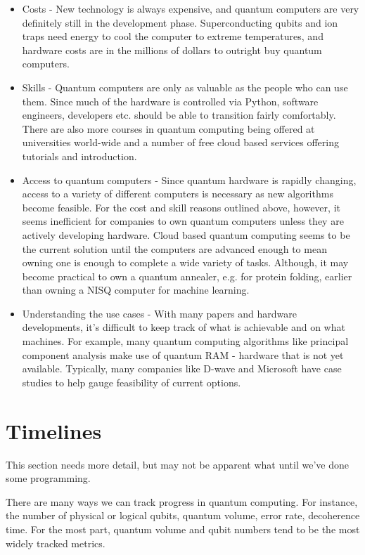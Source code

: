 \documentclass{article}
\theoremstyle{definition}
\begin{document}
\begin{itemize}
    \item Costs - New technology is always expensive, and quantum computers are very definitely still in the development phase. Superconducting qubits and ion traps need energy to cool the computer to extreme temperatures, and hardware costs are in the millions of dollars to outright buy quantum computers. 
    \item Skills - Quantum computers are only as valuable as the people who can use them. Since much of the hardware is controlled via Python, software engineers, developers etc. should be able to transition fairly comfortably. There are also more courses in quantum computing being offered at universities world-wide and a number of free cloud based services offering tutorials and introduction. 
    \item Access to quantum computers - Since quantum hardware is rapidly changing, access to a variety of different computers is necessary as new algorithms become feasible. For the cost and skill reasons outlined above, however, it seems inefficient for companies to own quantum computers unless they are actively developing hardware. Cloud based quantum computing seems to be the current solution until the computers are advanced enough to mean owning one is enough to complete a wide variety of tasks. Although, it may become practical to own a quantum annealer, e.g. for protein folding, earlier than owning a NISQ computer for machine learning. 
    \item Understanding the use cases - With many papers and hardware developments, it's difficult to keep track of what is achievable and on what machines. For example, many quantum computing algorithms like principal component analysis make use of quantum RAM - hardware that is not yet available. Typically, many companies like D-wave and Microsoft have case studies to help gauge feasibility of current options. 
    \end{itemize}

\section{Timelines}
This section needs more detail, but may not be apparent what until we've done some programming.


There are many ways we can track progress in quantum computing. For instance, the number of physical or logical qubits, quantum volume, error rate, decoherence time. For the most part, quantum volume and qubit numbers tend to be the most widely tracked metrics. 
\end{document}
